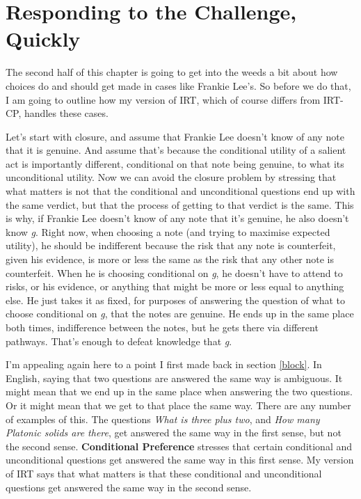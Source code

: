 \documentclass[
  11pt,
]{book}
\begin{document}
\hypertarget{tiesresponse}{%
\section{Responding to the Challenge, Quickly}\label{tiesresponse}}

The second half of this chapter is going to get into the weeds a bit about how choices do and should get made in cases like Frankie Lee's. So before we do that, I am going to outline how my version of IRT, which of course differs from IRT-CP, handles these cases.

Let's start with closure, and assume that Frankie Lee doesn't know of any note that it is genuine. And assume that's because the conditional utility of a salient act is importantly different, conditional on that note being genuine, to what its unconditional utility. Now we can avoid the closure problem by stressing that what matters is not that the conditional and unconditional questions end up with the same verdict, but that the process of getting to that verdict is the same. This is why, if Frankie Lee doesn't know of any note that it's genuine, he also doesn't know \emph{g}. Right now, when choosing a note (and trying to maximise expected utility), he should be indifferent because the risk that any note is counterfeit, given his evidence, is more or less the same as the risk that any other note is counterfeit. When he is choosing conditional on \emph{g}, he doesn't have to attend to risks, or his evidence, or anything that might be more or less equal to anything else. He just takes it as fixed, for purposes of answering the question of what to choose conditional on \emph{g}, that the notes are genuine. He ends up in the same place both times, indifference between the notes, but he gets there via different pathways. That's enough to defeat knowledge that \emph{g}.

I'm appealing again here to a point I first made back in section \ref{block}. In English, saying that two questions are answered the same way is ambiguous. It might mean that we end up in the same place when answering the two questions. Or it might mean that we get to that place the same way. There are any number of examples of this. The questions \emph{What is three plus two}, and \emph{How many Platonic solids are there}, get answered the same way in the first sense, but not the second sense. \textbf{Conditional Preference} stresses that certain conditional and unconditional questions get answered the same way in this first sense. My version of IRT says that what matters is that these conditional and unconditional questions get answered the same way in the second sense.
\end{document}
